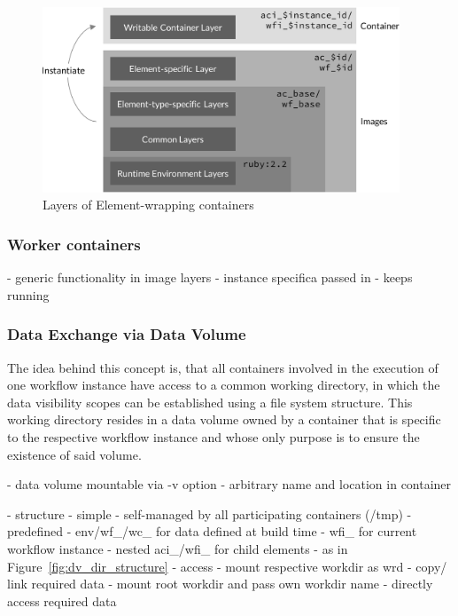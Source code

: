    \begin{figure}[htbp]
      \centering
      \includegraphics[width=0.95\textwidth]{content/images/layer_concept-crop.pdf}
      \caption{Layers of Element-wrapping containers}
      \label{fig:layers_for_element_wrapping_containers}
    \end{figure}

  \subsubsection{Worker containers} %
  \label{ssub:worker_containers}
    - generic functionality in image layers
    - instance specifica passed in
    - keeps running

  \subsubsection{Data Exchange via Data Volume} %
  \label{ssub:data_exchange_via_data_volume}

    The idea behind this concept is, that all containers involved in the execution of one workflow instance have access to a common working directory, in which the data visibility scopes can be established using a file system structure. This working directory resides in a data volume owned by a container that is specific to the respective workflow instance and whose only purpose is to ensure the existence of said volume.

    - data volume mountable via -v option
    - arbitrary name and location in container

    - structure
      - simple
        - self-managed by all participating containers (/tmp)
      - predefined
        - env/wf\_/wc\_ for data defined at build time
        - wfi\_ for current workflow instance
          - nested aci\_/wfi\_ for child elements
        - as in Figure~\ref{fig:dv_dir_structure}
    - access
      - mount respective workdir as wrd
        - copy/ link required data
      - mount root workdir and pass own workdir name
        - directly access required data

